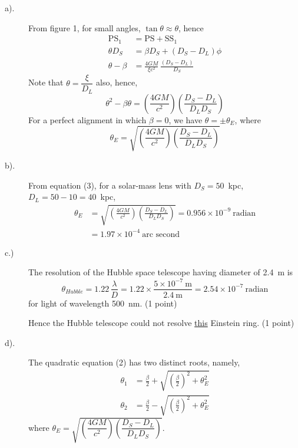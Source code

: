 \begin{description}
\item[a).] From figure 1, for small angles, $\tan\theta \approx \theta$, hence
\begin{align*}
\mathrm{PS}_1 &= \mathrm{PS} + \mathrm{SS}_1\\
\theta D_S &= \beta D_S + \left(D_S - D_L\right)\phi\\
\theta - \beta &= \frac{4GM}{\xi c^2}\,\frac{\left(D_S - D_L\right)}{D_S}
  \tag*{(1)\quad(1 point)}
\end{align*}
Note that $\theta = \dfrac{\xi}{D_L}$ also, hence,
\[
\theta^2 - \beta\theta
  = \left(\frac{4GM}{c^2}\right)\left(\frac{D_S - D_L}{D_L D_S}\right)
  \tag*{(2)}
\]
For a perfect alignment in which $\beta = 0$, we have $\theta = \pm\theta_E$,
where
\[
\theta_E = \sqrt{\left(\frac{4GM}{c^2}\right)\left(\frac{D_S - D_L}{D_L D_S}\right)}
  \tag*{(3)\quad(1 point)}
\]

\item[b).] From equation (3), for a solar-mass lens with $D_S = 50$~kpc,
$D_L = 50 - 10 = 40$~kpc,
\begin{align*}
\theta_E &= \sqrt{\left(\frac{4GM}{c^2}\right)
                  \left(\frac{D_S - D_L}{D_L D_S}\right)}
          = 0.956 \times 10^{-9}~\text{radian}\\
         &= 1.97 \times 10^{-4}~\text{arc second} \tag*{(1 point)}
\end{align*}

\item[c.)] The resolution of the Hubble space telescope having diameter of
2.4~m is
\[
\theta_{Hubble} = 1.22\,\frac{\lambda}{D}
  = 1.22 \times \frac{5 \times 10^{-7}~\mathrm{m}}{2.4~\mathrm{m}}
  = 2.54 \times 10^{-7}~\text{radian}
\]
for light of wavelength 500~nm. \hfill(1 point)

Hence the Hubble telescope could not resolve \underline{this} Einstein ring.
\hfill(1 point)

\item[d).] The quadratic equation (2) has two distinct roots, namely,
\begin{align*}
\theta_1 &= \frac{\beta}{2}
  + \sqrt{\left(\frac{\beta}{2}\right)^2 + \theta_E^2} \tag*{(1 point)}\\
\theta_2 &= \frac{\beta}{2}
  - \sqrt{\left(\frac{\beta}{2}\right)^2 + \theta_E^2} \tag*{(1 point)}
\end{align*}
where $\theta_E = \sqrt{\left(\dfrac{4GM}{c^2}\right)
\left(\dfrac{D_S - D_L}{D_L D_S}\right)}$.


\end{description}
